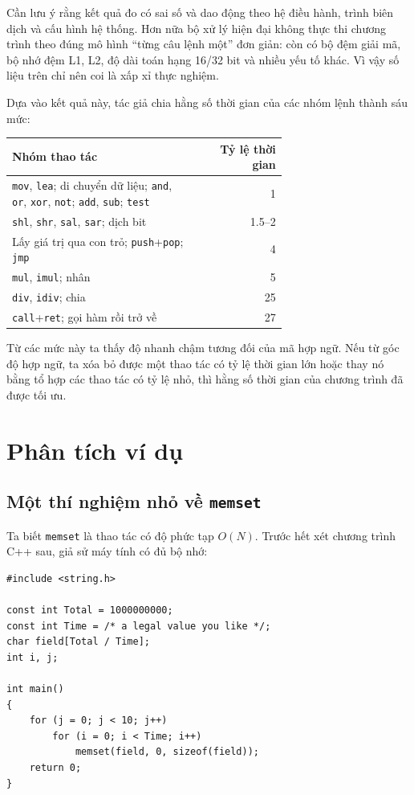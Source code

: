 \documentclass[11pt]{article}
\begin{document}
Cần lưu ý rằng kết quả đo có sai số và dao động theo hệ điều hành, trình biên
dịch và cấu hình hệ thống. Hơn nữa bộ xử lý hiện đại không thực thi chương
trình theo đúng mô hình ``từng câu lệnh một'' đơn giản: còn có bộ đệm giải mã,
bộ nhớ đệm L1, L2, độ dài toán hạng 16/32 bit và nhiều yếu tố khác. Vì vậy số
liệu trên chỉ nên coi là xấp xỉ thực nghiệm.

Dựa vào kết quả này, tác giả chia hằng số thời gian của các nhóm lệnh thành
sáu mức:

\begin{center}
\small
\begin{tabular}{p{0.68\linewidth}r}
\hline
Nhóm thao tác & Tỷ lệ thời gian \\
\hline
\texttt{mov}, \texttt{lea}; di chuyển dữ liệu; \texttt{and}, \texttt{or},
\texttt{xor}, \texttt{not}; \texttt{add}, \texttt{sub}; \texttt{test} & 1 \\
\texttt{shl}, \texttt{shr}, \texttt{sal}, \texttt{sar}; dịch bit & 1.5--2 \\
Lấy giá trị qua con trỏ; \texttt{push}+\texttt{pop}; \texttt{jmp} & 4 \\
\texttt{mul}, \texttt{imul}; nhân & 5 \\
\texttt{div}, \texttt{idiv}; chia & 25 \\
\texttt{call}+\texttt{ret}; gọi hàm rồi trở về & 27 \\
\hline
\end{tabular}
\end{center}

Từ các mức này ta thấy độ nhanh chậm tương đối của mã hợp ngữ. Nếu từ góc độ
hợp ngữ, ta xóa bỏ được một thao tác có tỷ lệ thời gian lớn hoặc thay nó bằng
tổ hợp các thao tác có tỷ lệ nhỏ, thì hằng số thời gian của chương trình đã
được tối ưu.

\section{Phân tích ví dụ}

\subsection{Một thí nghiệm nhỏ về \texttt{memset}}

Ta biết \texttt{memset} là thao tác có độ phức tạp \(O(N)\). Trước hết xét
chương trình C++ sau, giả sử máy tính có đủ bộ nhớ:
\begin{verbatim}
#include <string.h>

const int Total = 1000000000;
const int Time = /* a legal value you like */;
char field[Total / Time];
int i, j;

int main()
{
    for (j = 0; j < 10; j++)
        for (i = 0; i < Time; i++)
            memset(field, 0, sizeof(field));
    return 0;
}
\end{verbatim}
\end{document}
